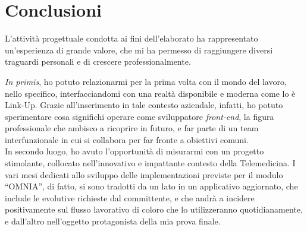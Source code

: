 
\chapter{Conclusioni}
L'attività progettuale condotta ai fini dell'elaborato ha rappresentato un'esperienza di grande valore, che mi ha permesso di raggiungere diversi traguardi personali e di crescere professionalmente.

\textit{In primis}, ho potuto relazionarmi per la prima volta con il mondo del lavoro, nello specifico, interfacciandomi con una realtà disponibile e moderna come lo è Link-Up. Grazie all'inserimento in tale contesto aziendale, infatti, ho potuto sperimentare cosa significhi operare come sviluppatore \textit{front-end}, la figura professionale che ambisco a ricoprire in futuro, e far parte di un team interfunzionale in cui si collabora per far fronte a obiettivi comuni.\\
In secondo luogo, ho avuto l'opportunità di misurarmi con un progetto stimolante, collocato nell'innovativo e impattante contesto della Telemedicina. I vari mesi dedicati allo sviluppo delle implementazioni previste per il modulo “OMNIA”, di fatto, si sono tradotti da un lato in un applicativo aggiornato, che include le evolutive richieste dal committente, e che andrà a incidere positivamente sul flusso lavorativo di coloro che lo utilizzeranno quotidianamente, e dall'altro nell'oggetto protagonista della mia prova finale.

